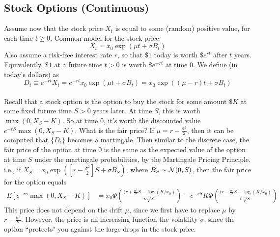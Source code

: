 \documentclass[11pt]{article}
\begin{document}
   	\subsection{Stock Options (Continuous)}
   	Assume now that the stock price $X_t$ is equal to some (random) positive value, for each time $t \geq 0$. Common model for the stock price:
   	$$X_t = x_0\exp(\mu t + \sigma B_t)$$
   	Also assume a risk-free interest rate $r$, so that $\$ 1$ today is worth $\$ e^{rt}$ after $t$ years. Equivalently, $\$ 1$ at a future time $t > 0$ is worth $\$ e^{-rt}$ at time $0$. 
   	We define  (in today's dollars) as
   	$$D_t \equiv e^{-rt}X_t = e^{-rt}x_0\exp(\mu t + \sigma B_t) = x_0 \exp((\mu - r)t + \sigma B_t)$$\\
   	Recall that a stock option is the option to buy the stock for some amount $\$ K$ at some fixed future time $S > 0$ years later. At time $S$, this is worth $\max(0, X_S - K)$. So at time 0, it's worth the discounted value $e^{-rS}\max(0, X_S - K)$. 
   	\remark
   	What is the fair price?
   	\fact
   	If $\mu = r - \frac{\sigma^2}{2}$, then it can be computed that $\{D_t\}$ becomes a martingale. Then similar to the discrete case, the fair price of the option at time 0 is the same as the expected value of the option at time $S$ under the martingale probabilities, by the Martingale Pricing Principle.\\
   	i.e., if $X_S = x_0\exp([r - \frac{\sigma^2}{2}]S + \sigma B_S)$, where $B_S \sim \mathcal{N}(0,S)$, then the fair price for the option equals
   	\begin{align*}
   		E[e^{-rs}\max(0, X_S - K)] &= x_0\Phi\left( \frac{(r+\frac{\sigma^2}{2}S - \log(K/x_0)}{\sigma\sqrt{S}} \right) - e^{-rS}K\Phi\left( \frac{(r-\frac{\sigma^2}{2}S - \log(K/x_0)}{\sigma \sqrt{S}}\right)
   	\end{align*}
   	\remark
   	This price does not depend on the drift $\mu$, since we first have to replace $\mu$ by $r - \frac{\sigma^2}{2}$. However, the price is an increasing function the volatility $\sigma$, since the option ``protects" you against the large drops in the stock price.
   	
\end{document}
